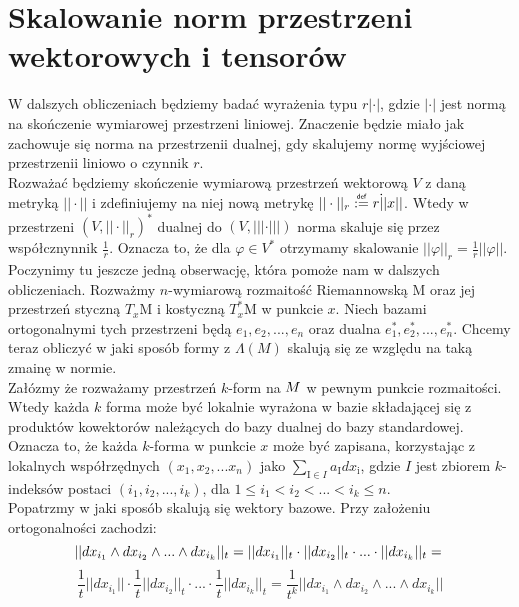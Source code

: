\documentclass[licencjacka]{pracamgr}
\theoremstyle{definition}
\theoremstyle{definition}
\theoremstyle{plain}
\theoremstyle{plain}
\def\M{\ensuremath M}
\newcommand\deff{\mathrel{\overset{\makebox[0pt]{\mbox{\normalfont\tiny\sffamily def}}}{:=}}}
\begin{document}
\section{Skalowanie norm przestrzeni wektorowych i tensorów}
W dalszych obliczeniach będziemy badać wyrażenia typu $r |\cdot|$, gdzie
$|\cdot|$ jest normą na skończenie wymiarowej przestrzeni liniowej.
Znaczenie będzie miało jak zachowuje się norma na przestrzenii dualnej,
gdy skalujemy normę wyjściowej przestrzenii liniowo o czynnik $r$. \\


Rozważać będziemy skończenie wymiarową przestrzeń wektorową $V$ z daną
metryką $|| \cdot ||$ i zdefiniujemy na niej nową metrykę $|| \cdot
||_r \deff r \dot || x ||$. Wtedy w przestrzeni $(V, ||
\cdot||_r)^\ast$ dualnej do $(V, ||| \cdot |||)$ norma skaluje się
przez współcznynnik $\frac{1}{r}$. Oznacza to, że dla $\varphi \in
V^\ast$ otrzymamy skalowanie $||\varphi||_r = \frac{1}{r} ||\varphi||$. \\

Poczynimy tu jeszcze jedną obserwację, która pomoże nam w dalszych
obliczeniach.  Rozważmy $n$-wymiarową rozmaitość Riemannowską
$\mathrm{M}$ oraz jej przestrzeń styczną $T_x\mathrm{M}$ i kostyczną
$T_x^\ast\mathrm{M}$ w punkcie $x$.  Niech bazami ortogonalnymi tych
przestrzeni będą $e_1, e_2, ..., e_n$ oraz dualna $e_1^\ast, e_2^\ast,
..., e_n^\ast$.  Chcemy teraz obliczyć w jaki sposób formy z
$\Lambda(M)$ skalują się ze względu na taką zmainę w
normie. \\

Załózmy że rozważamy przestrzeń $k$-form na $\M$ w pewnym
punkcie rozmaitości. Wtedy każda $k$ forma może być lokalnie wyrażona
w bazie składającej się z produktów kowektorów należących do bazy
dualnej do bazy standardowej. Oznacza to, że każda $k$-forma w punkcie
$x$ może być zapisana, korzystając z lokalnych współrzędnych $(x_1,
x_2, ... x_n)$ jako $ \sum_{\mathrm{I} \in I } a_\mathrm{I}
dx_\mathrm{i}$, gdzie $I$ jest zbiorem $k$-indeksów postaci
$(i_1, i_2, ..., i_k)$, dla $ 1 \leq i_1 < i_2 < ... < i_k \leq n$.  \\

Popatrzmy w jaki sposób skalują się wektory bazowe. Przy założeniu ortogonalności
zachodzi:
\[
    ||dx_{i_1} \wedge dx_{i_2} \wedge ... \wedge dx_{i_k} ||_t =  
    ||dx_{i_1} ||_t \cdot ||  dx_{i_2} ||_t \cdot ... \cdot || dx_{i_k} ||_t =  \\
\]
\[
    \frac{1}{t}||dx_{i_1} || \cdot \frac{1}{t} ||  dx_{i_2} ||_t \cdot ...
     \cdot \frac{1}{t} || dx_{i_k} ||_t = 
    \frac{1}{t^k}||dx_{i_1} \wedge dx_{i_2} \wedge ... \wedge dx_{i_k} ||
\]
\end{document}
